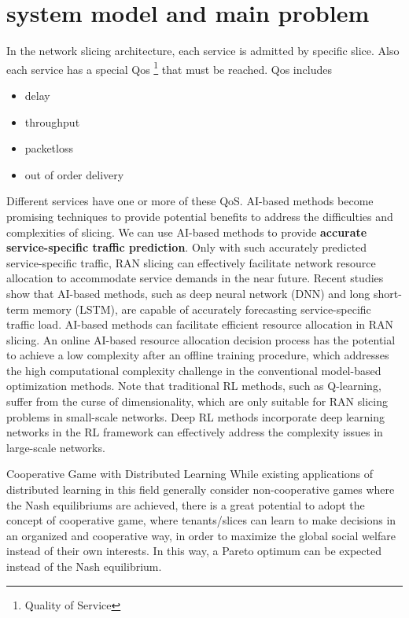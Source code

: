\documentclass[conference]{IEEEtran}
\begin{document}
\section{system model and main problem}
In the network slicing architecture, each service is admitted by specific slice. Also each service has a special Qos \footnote{Quality of Service} that must be reached. 
Qos includes 
\begin{itemize}
\item delay
\item throughput
\item packetloss
\item out of order delivery
\end{itemize}  
Different services have one or more of these QoS.
AI-based methods become promising techniques to provide
potential benefits to address the difficulties and complexities of slicing.
We can use AI-based methods
to provide \textbf{accurate service-specific traffic prediction}.
Only
with such accurately predicted service-specific traffic, RAN
slicing can effectively facilitate network resource allocation to
accommodate service demands in the near future. Recent studies show that AI-based methods, such as deep neural network
(DNN) and long short-term memory (LSTM), are capable of
accurately forecasting service-specific traffic load.
AI-based methods can facilitate efficient resource allocation in RAN slicing. An online AI-based resource allocation decision process has the potential to achieve
a low complexity after an offline training procedure, which
addresses the high computational complexity challenge in the
conventional model-based optimization methods.
 Note that traditional RL methods, such as
Q-learning, suffer from the curse of dimensionality, which are
only suitable for RAN slicing problems in small-scale networks. Deep RL methods incorporate deep learning networks
in the RL framework can effectively address the complexity
issues in large-scale networks. 


 Cooperative Game with Distributed Learning
While existing applications of distributed learning in this field generally consider non-cooperative games where the Nash
equilibriums are achieved, there is a great potential to adopt the concept of cooperative game, where tenants/slices can learn to
make decisions in an organized and cooperative way, in order to maximize the global social welfare instead of their own interests.
In this way, a Pareto optimum can be expected instead of the Nash equilibrium.
\end{document}
